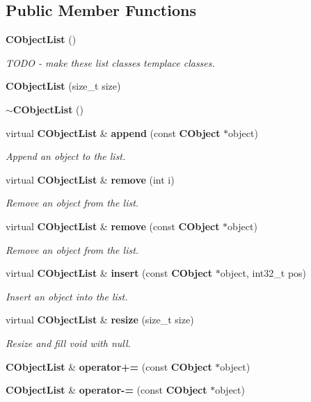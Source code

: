 \subsection*{Public Member Functions}
\begin{DoxyCompactItemize}
\item 
{\bf C\+Object\+List} ()
\begin{DoxyCompactList}\small\item\em T\+O\+DO -\/ make these list classes templace classes. \end{DoxyCompactList}\item 
{\bf C\+Object\+List} (size\+\_\+t size)
\item 
{\bf $\sim$\+C\+Object\+List} ()
\item 
virtual {\bf C\+Object\+List} \& {\bf append} (const {\bf C\+Object} $\ast$object)
\begin{DoxyCompactList}\small\item\em Append an object to the list. \end{DoxyCompactList}\item 
virtual {\bf C\+Object\+List} \& {\bf remove} (int i)
\begin{DoxyCompactList}\small\item\em Remove an object from the list. \end{DoxyCompactList}\item 
virtual {\bf C\+Object\+List} \& {\bf remove} (const {\bf C\+Object} $\ast$object)
\begin{DoxyCompactList}\small\item\em Remove an object from the list. \end{DoxyCompactList}\item 
virtual {\bf C\+Object\+List} \& {\bf insert} (const {\bf C\+Object} $\ast$object, int32\+\_\+t pos)
\begin{DoxyCompactList}\small\item\em Insert an object into the list. \end{DoxyCompactList}\item 
virtual {\bf C\+Object\+List} \& {\bf resize} (size\+\_\+t size)
\begin{DoxyCompactList}\small\item\em Resize and fill void with null. \end{DoxyCompactList}\item 
{\bf C\+Object\+List} \& {\bf operator+=} (const {\bf C\+Object} $\ast$object)
\item 
{\bf C\+Object\+List} \& {\bf operator-\/=} (const {\bf C\+Object} $\ast$object)

\end{DoxyCompactItemize}

